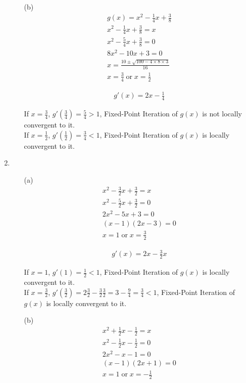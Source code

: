 \documentclass[UTF8]{ctexart}
\begin{document}
\begin{enumerate}
\begin{itemize}
\item[(b)]
\begin{gather*}
g(x) = x^2 - \frac{1}{4}x + \frac{3}{8} \\
x^2 - \frac{1}{4}x + \frac{3}{8} = x \\
x^2 - \frac{5}{4}x + \frac{3}{8} = 0 \\
8x^2 - 10x + 3 = 0 \\
x = \frac{10 \pm \sqrt{100 - 4 \times 8 \times 3}}{16} \\
x = \frac{3}{4} \; \text{or} \; x = \frac{1}{2}
\end{gather*}

\begin{gather*}
g'(x) = 2x - \frac{1}{4}
\end{gather*}

If $x = \frac{3}{4}$, $g'(\frac{3}{4}) = \frac{5}{4} > 1$, Fixed-Point Iteration of $g(x)$ is not locally convergent to it.\\
If $x = \frac{1}{2}$, $g'(\frac{1}{2}) = \frac{3}{4} < 1$, Fixed-Point Iteration of $g(x)$ is locally convergent to it.

\end{itemize}

\item \begin{itemize}
\item[(a)]
\begin{gather*}
x^2 - \frac{3}{2}x + \frac{3}{2} = x \\
x^2 - \frac{5}{2}x + \frac{3}{2} = 0 \\
2x^2 - 5x + 3 = 0 \\
(x - 1)(2x - 3) = 0 \\
x = 1 \; \text{or} \; x = \frac{3}{2}
\end{gather*}

\begin{gather*}
g'(x) = 2x - \frac{3}{2}x
\end{gather*}

If $x = 1$, $g'(1) = \frac{1}{2} < 1$, Fixed-Point Iteration of $g(x)$ is locally convergent to it.\\
If $x = \frac{3}{2}$, $g'(\frac{3}{2}) = 2\frac{3}{2} - \frac{3}{2}\frac{3}{2} = 3 - \frac{9}{4} = \frac{3}{4} < 1$, Fixed-Point Iteration of $g(x)$ is locally convergent to it.

\item[(b)]
\begin{gather*}
x^2 + \frac{1}{2}x - \frac{1}{2} = x \\
x^2 - \frac{1}{2}x - \frac{1}{2} = 0 \\
2x^2 - x - 1 = 0 \\
(x - 1)(2x + 1) = 0 \\
x = 1 \; \text{or} \; x = -\frac{1}{2}
\end{gather*}


\end{itemize}
\end{enumerate}
\end{document}
